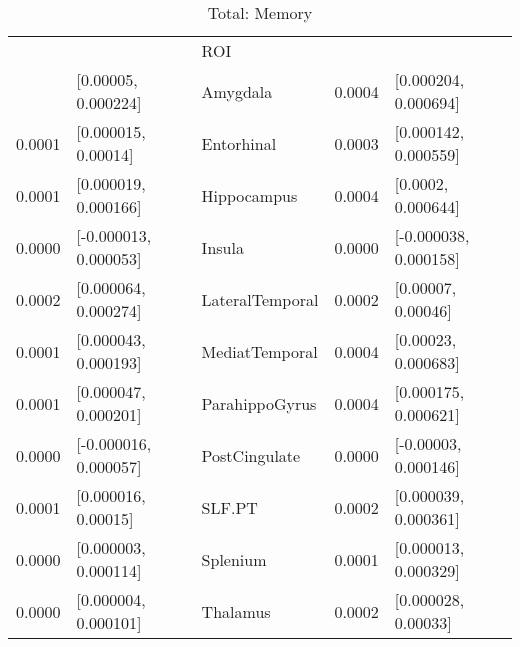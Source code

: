 \documentclass{article}
\begin{document}
\begin{table}[H]
\centering
\caption{Total: Memory} 
\begin{tabular}{rllrl}
  \toprule
\cellcolor{red!30}{B2} & \cellcolor{red!30}{CI} & ROI & \cellcolor{blue!30}{B3} & \cellcolor{blue!30}{CI} \\ 
  \rowcolor{green!30} \midrule
0.0001 & [0.00005, 0.000224] & Amygdala & 0.0004 & [0.000204, 0.000694] \\ 
   \rowcolor{green!30}0.0001 & [0.000015, 0.00014] & Entorhinal & 0.0003 & [0.000142, 0.000559] \\ 
   \rowcolor{green!30}0.0001 & [0.000019, 0.000166] & Hippocampus & 0.0004 & [0.0002, 0.000644] \\ 
  0.0000 & [-0.000013, 0.000053] & Insula & 0.0000 & [-0.000038, 0.000158] \\ 
   \rowcolor{green!30}0.0002 & [0.000064, 0.000274] & LateralTemporal & 0.0002 & [0.00007, 0.00046] \\ 
   \rowcolor{green!30}0.0001 & [0.000043, 0.000193] & MediatTemporal & 0.0004 & [0.00023, 0.000683] \\ 
   \rowcolor{green!30}0.0001 & [0.000047, 0.000201] & ParahippoGyrus & 0.0004 & [0.000175, 0.000621] \\ 
  0.0000 & [-0.000016, 0.000057] & PostCingulate & 0.0000 & [-0.00003, 0.000146] \\ 
   \rowcolor{green!30}0.0001 & [0.000016, 0.00015] & SLF.PT & 0.0002 & [0.000039, 0.000361] \\ 
   \rowcolor{green!30}0.0000 & [0.000003, 0.000114] & Splenium & 0.0001 & [0.000013, 0.000329] \\ 
   \rowcolor{green!30}0.0000 & [0.000004, 0.000101] & Thalamus & 0.0002 & [0.000028, 0.00033] \\ 
   \bottomrule
\end{tabular}
\end{table}
\newpage
\end{document}
